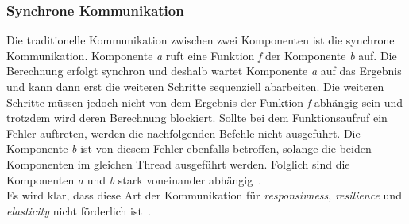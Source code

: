 \subsubsection{Synchrone Kommunikation}
Die traditionelle Kommunikation zwischen zwei Komponenten ist die synchrone Kommunikation. Komponente \textit{a} ruft eine Funktion \textit{f} der Komponente \textit{b} auf. Die Berechnung erfolgt synchron und deshalb wartet Komponente \textit{a} auf das Ergebnis und kann dann erst die weiteren Schritte sequenziell abarbeiten. Die weiteren Schritte müssen jedoch nicht von dem Ergebnis der Funktion \textit{f} abhängig sein und trotzdem wird deren Berechnung blockiert. Sollte bei dem Funktionsaufruf ein Fehler auftreten, werden die nachfolgenden Befehle nicht ausgeführt. Die Komponente \textit{b} ist von diesem Fehler ebenfalls betroffen, solange die beiden Komponenten im gleichen Thread ausgeführt werden. Folglich sind die Komponenten \textit{a} und \textit{b} stark voneinander abhängig~\cite[S.~22]{kuhn_reactive_2015}.\\
Es wird klar, dass diese Art der Kommunikation für \textit{responsivness}, \textit{resilience} und \textit{elasticity} nicht förderlich ist~\cite[S.~46]{kuhn_reactive_2015}.

